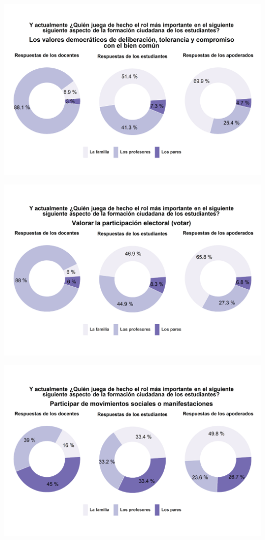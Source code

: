 \documentclass[
  14pt,
]{book}
\begin{document}
\begin{center}\includegraphics[width=52.49in]{images/graph_for_ciud8} \end{center}

\begin{center}\includegraphics[width=52.49in]{images/graph_for_ciud9} \end{center}

\begin{center}\includegraphics[width=52.49in]{images/graph_for_ciud10} \end{center}
\end{document}
